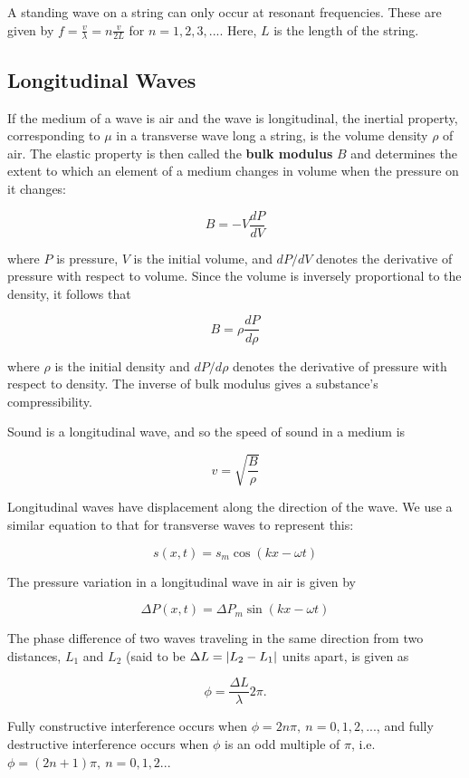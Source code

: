 \documentclass{article}
\begin{document}
A standing wave on a string can only occur at resonant frequencies. These are given by $f = \frac{v}{\lambda} = n\frac{v}{2L}$ for $n = 1,2,3,...$. Here, $L$ is the length of the string.

\subsection{Longitudinal Waves}

If the medium of a wave is air and the wave is longitudinal, the inertial property, corresponding to $\mu$ in a transverse wave long a string, is the volume density $\rho$ of air. The elastic property is then called the \textbf{bulk modulus} $B$ and determines the extent to which an element of a medium changes in volume when the pressure on it changes:

\[ B = -V \frac{dP}{dV} \]

where $P$ is pressure, $V$ is the initial volume, and $dP/dV$ denotes the derivative of pressure with respect to volume. Since the volume is inversely proportional to the density, it follows that

\[ B = \rho \frac{dP}{d\rho} \]

where $\rho$ is the initial density and $dP/d\rho$ denotes the derivative of pressure with respect to density. The inverse of bulk modulus gives a substance's compressibility.

Sound is a longitudinal wave, and so the speed of sound in a medium is

\[ v = \sqrt{\frac{B}{\rho}} \] 

Longitudinal waves have displacement along the direction of the wave. We use a similar equation to that for transverse waves to represent this:

\[ s(x,t) = s_m \cos{(kx - \omega t)} \]

The pressure variation in a longitudinal wave in air is given by

\[ \Delta P(x,t) = \Delta P_m \sin{(kx - \omega t)} \]

The phase difference of two waves traveling in the same direction from two distances, $L_1$ and $L_2$ (said to be $\Delta L = \left| L_2 - L_1 \right|$ units apart, is given as

\[ \phi = \frac{\Delta L}{\lambda} 2 \pi. \]

Fully constructive interference occurs when $\phi = 2 n \pi,~ n = 0, 1, 2, ...$, and fully destructive interference occurs when $\phi$ is an odd multiple of $\pi$, i.e. $\phi = (2n + 1)\pi, ~n = 0, 1, 2 ... $
\end{document}
